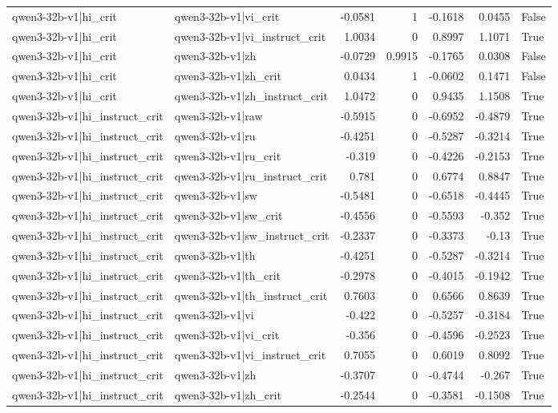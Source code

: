 \begin{table}
\begin{tabular}{l l r r r r l}
qwen3-32b-v1|hi_crit & qwen3-32b-v1|vi_crit & -0.0581 & 1 & -0.1618 & 0.0455 & False \\
qwen3-32b-v1|hi_crit & qwen3-32b-v1|vi_instruct_crit & 1.0034 & 0 & 0.8997 & 1.1071 & True \\
qwen3-32b-v1|hi_crit & qwen3-32b-v1|zh & -0.0729 & 0.9915 & -0.1765 & 0.0308 & False \\
qwen3-32b-v1|hi_crit & qwen3-32b-v1|zh_crit & 0.0434 & 1 & -0.0602 & 0.1471 & False \\
qwen3-32b-v1|hi_crit & qwen3-32b-v1|zh_instruct_crit & 1.0472 & 0 & 0.9435 & 1.1508 & True \\
qwen3-32b-v1|hi_instruct_crit & qwen3-32b-v1|raw & -0.5915 & 0 & -0.6952 & -0.4879 & True \\
qwen3-32b-v1|hi_instruct_crit & qwen3-32b-v1|ru & -0.4251 & 0 & -0.5287 & -0.3214 & True \\
qwen3-32b-v1|hi_instruct_crit & qwen3-32b-v1|ru_crit & -0.319 & 0 & -0.4226 & -0.2153 & True \\
qwen3-32b-v1|hi_instruct_crit & qwen3-32b-v1|ru_instruct_crit & 0.781 & 0 & 0.6774 & 0.8847 & True \\
qwen3-32b-v1|hi_instruct_crit & qwen3-32b-v1|sw & -0.5481 & 0 & -0.6518 & -0.4445 & True \\
qwen3-32b-v1|hi_instruct_crit & qwen3-32b-v1|sw_crit & -0.4556 & 0 & -0.5593 & -0.352 & True \\
qwen3-32b-v1|hi_instruct_crit & qwen3-32b-v1|sw_instruct_crit & -0.2337 & 0 & -0.3373 & -0.13 & True \\
qwen3-32b-v1|hi_instruct_crit & qwen3-32b-v1|th & -0.4251 & 0 & -0.5287 & -0.3214 & True \\
qwen3-32b-v1|hi_instruct_crit & qwen3-32b-v1|th_crit & -0.2978 & 0 & -0.4015 & -0.1942 & True \\
qwen3-32b-v1|hi_instruct_crit & qwen3-32b-v1|th_instruct_crit & 0.7603 & 0 & 0.6566 & 0.8639 & True \\
qwen3-32b-v1|hi_instruct_crit & qwen3-32b-v1|vi & -0.422 & 0 & -0.5257 & -0.3184 & True \\
qwen3-32b-v1|hi_instruct_crit & qwen3-32b-v1|vi_crit & -0.356 & 0 & -0.4596 & -0.2523 & True \\
qwen3-32b-v1|hi_instruct_crit & qwen3-32b-v1|vi_instruct_crit & 0.7055 & 0 & 0.6019 & 0.8092 & True \\
qwen3-32b-v1|hi_instruct_crit & qwen3-32b-v1|zh & -0.3707 & 0 & -0.4744 & -0.267 & True \\
qwen3-32b-v1|hi_instruct_crit & qwen3-32b-v1|zh_crit & -0.2544 & 0 & -0.3581 & -0.1508 & True \\

\end{tabular}
\end{table}
